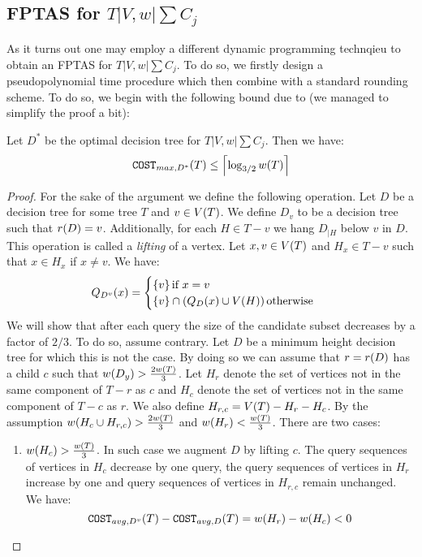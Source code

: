\subsection{FPTAS for $T|V,w|\sum C_j$}
As it turns out one may employ a different dynamic programming technqieu to obtain an FPTAS for $T|V,w|\sum C_j$. To do so, we firstly design a pseudopolynomial time procedure which then combine with a standard rounding scheme. To do so, we begin with the following bound due to \cite{Fast_app_centroid_trees} (we managed to simplify the proof a bit):
\begin{theorem}
    Let $D^*$ be the optimal decision tree for $T|V,w|\sum C_j$. Then we have:
    $$\texttt{COST}_{max, D^*}\mathopen{}\left( T \right)\leq \mathopen{}\left\lceil \log_{3/2}w\mathopen{}\left( T \right) \right\rceil$$
    \begin{proof}
        For the sake of the argument we define the following operation. Let $D$ be a decision tree for some tree $T$ and $v\in V\mathopen{}\left( T \right)$. We define $D_v$ to be a decision tree such that $r\mathopen{}\left( D \right)=v$. Additionally, for each $H\in T-v$ we hang $D_{|H}$ below $v$ in $D$. This operation is called a \textit{lifting} of a vertex. Let $x,v\in V\mathopen{}\left( T \right)$ and $H_x\in T-v$ such that $x\in H_x$ if $x\neq v$. We have:
        $$
        Q_{D^v}\mathopen{}\left( x \right)=\begin{cases}
            \mathopen{}\left\{ v \right\} \text{if } x=v\\
            \mathopen{}\left\{ v \right\}\cap \mathopen{}\left( Q_{D}\mathopen{}\left( x \right)\cup V\mathopen{}\left( H \right) \right) \text{otherwise }
        \end{cases}
        $$
        We will show that after each query the size of the candidate subset decreases by a factor of $2/3$. To do so, assume contrary. Let $D$ be a minimum height decision tree for which this is not the case. By doing so we can assume that $r=r\mathopen{}\left( D \right)$ has a child $c$ such that $w\mathopen{}\left( D_y \right)> \frac{2w\mathopen{}\left( T \right)}{3}$. Let $H_r$ denote the set of vertices not in the same component of $T-r$ as $c$ and $H_c$ denote the set of vertices not in the same component of $T-c$ as $r$. We also define $H_{r, c}=V\mathopen{}\left( T \right)-H_r-H_c$. By the assumption $w\mathopen{}\left( H_c\cup H_{r, c} \right)>\frac{2w\mathopen{}\left( T \right)}{3}$ and $w\mathopen{}\left( H_r \right)<\frac{w\mathopen{}\left( T \right)}{3}$. There are two cases:
        \begin{enumerate}
            \item $w\mathopen{}\left( H_c \right)>\frac{w\mathopen{}\left( T \right)}{3}$. In such case we augment $D$ by lifting $c$. The query sequences of vertices in $H_c$ decrease by one query, the
query sequences of vertices in $H_r$ increase by one and query sequences of vertices in $H_{r,c}$ remain unchanged. We have:
$$
\texttt{COST}_{avg, D^v}\mathopen{}\left( T \right)-\texttt{COST}_{avg, D}\mathopen{}\left( T \right)=w\mathopen{}\left( H_r \right)-w\mathopen{}\left( H_c \right)< 0
$$
\end{enumerate}
\end{proof}
\end{theorem}
